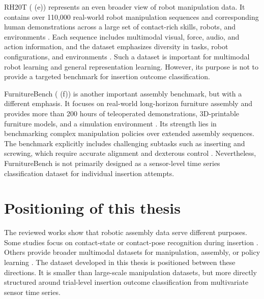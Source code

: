 RH20T ( (e)) represents an even broader view of robot manipulation data. It contains over 110,000 real-world robot manipulation sequences and corresponding human demonstrations across a large set of contact-rich skills, robots, and environments \cite{fangRH20TComprehensiveRobotic2024}. Each sequence includes multimodal visual, force, audio, and action information, and the dataset emphasizes diversity in tasks, robot configurations, and environments \cite{fangRH20TComprehensiveRobotic2024}. Such a dataset is important for multimodal robot learning and general representation learning. However, its purpose is not to provide a targeted benchmark for insertion outcome classification.

FurnitureBench ( (f)) is another important assembly benchmark, but with a different emphasis. It focuses on real-world long-horizon furniture assembly and provides more than 200 hours of teleoperated demonstrations, 3D-printable furniture models, and a simulation environment \cite{heoFurnitureBenchReproducibleRealworld2025a}. Its strength lies in benchmarking complex manipulation policies over extended assembly sequences. The benchmark explicitly includes challenging subtasks such as inserting and screwing, which require accurate alignment and dexterous control \cite{heoFurnitureBenchReproducibleRealworld2025a}. Nevertheless, FurnitureBench is not primarily designed as a sensor-level time series classification dataset for individual insertion attempts.

\section{Positioning of this thesis}

The reviewed works show that robotic assembly data serve different purposes. Some studies focus on contact-state or contact-pose recognition during insertion \cite{jasimContactstateMonitoringForceguided2014,jinContactPoseIdentification2021a,yanLearningbasedContactStatus2021}. Others provide broader multimodal datasets for manipulation, assembly, or policy learning \cite{sliwowskiREASSEMBLEMultimodalDataset2025,fangRH20TComprehensiveRobotic2024,heoFurnitureBenchReproducibleRealworld2025a}. The dataset developed in this thesis is positioned between these directions. It is smaller than large-scale manipulation datasets, but more directly structured around trial-level insertion outcome classification from multivariate sensor time series.

